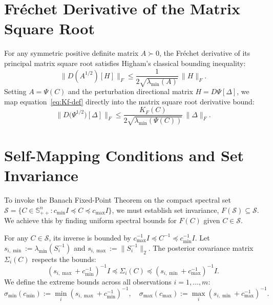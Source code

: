 \documentclass[11pt,a4paper]{article}
\begin{document}
\section{Fr\'echet Derivative of the Matrix Square Root}
For any symmetric positive definite matrix $A \succ 0$, the Fr\'echet derivative of its principal matrix square root satisfies Higham's classical bounding inequality:
\begin{equation}\label{eq:sqrt-bound}
\|D(A^{1/2})[H]\|_F \le \frac{1}{2\sqrt{\lambda_{\min}(A)}}\,\|H\|_F.
\end{equation}
Setting $A = \Psi(C)$ and the perturbation directional matrix $H = D\Psi[\Delta]$, we map equation~\eqref{eq:Kf-def} directly into the matrix square root derivative bound:
\begin{equation}\label{eq:dPsisqrt}
\|D\big(\Psi^{1/2}\big)[\Delta]\|_F \le \frac{K_F(C)}{2\sqrt{\lambda_{\min}(\Psi(C))}}\,\|\Delta\|_F.
\end{equation}

\section{Self-Mapping Conditions and Set Invariance}
To invoke the Banach Fixed-Point Theorem on the compact spectral set $\mathcal{S} = \{C \in \mathbb{S}_{++}^n : c_{\min}I \preceq C \preceq c_{\max}I\}$, we must establish set invariance, $F(\mathcal{S}) \subseteq \mathcal{S}$. We achieve this by finding uniform spectral bounds for $F(C)$ given $C \in \mathcal{S}$.

For any $C \in \mathcal{S}$, its inverse is bounded by $c_{\max}^{-1}I \preceq C^{-1} \preceq c_{\min}^{-1}I$. Let $s_{i,\min} := \lambda_{\min}(S_i^{-1})$ and $s_{i,\max} := \|S_i^{-1}\|_2$. The posterior covariance matrix $\Sigma_i(C)$ respects the bounds:
\begin{equation}
(s_{i,\max} + c_{\min}^{-1})^{-1}I \preceq \Sigma_i(C) \preceq (s_{i,\min} + c_{\max}^{-1})^{-1}I.
\end{equation}
We define the extreme bounds across all observations $i=1,\dots,m$:
\begin{equation}
\sigma_{\min}(c_{\min}) := \min_{i} (s_{i,\max} + c_{\min}^{-1})^{-1}, \quad \sigma_{\max}(c_{\max}) := \max_{i} (s_{i,\min} + c_{\max}^{-1})^{-1}.
\end{equation}
\end{document}
